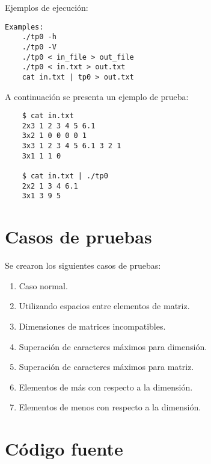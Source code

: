 \documentclass[a4paper,10pt]{article}
\begin{document}
Ejemplos de ejecuci\'on:
\begin{verbatim}
Examples:
	./tp0 -h
	./tp0 -V
	./tp0 < in_file > out_file
	./tp0 < in.txt > out.txt
	cat in.txt | tp0 > out.txt

\end{verbatim}

A continuaci\'on se presenta un ejemplo de prueba:
\begin{verbatim}
	$ cat in.txt
	2x3 1 2 3 4 5 6.1
	3x2 1 0 0 0 0 1
	3x3 1 2 3 4 5 6.1 3 2 1
	3x1 1 1 0

	$ cat in.txt | ./tp0
	2x2 1 3 4 6.1
	3x1 3 9 5
\end{verbatim}
\pagebreak


\section{Casos de pruebas}
Se crearon los siguientes casos de pruebas:
\begin{enumerate}
\item Caso normal.	
\item Utilizando espacios entre elementos de matriz.
\item Dimensiones de matrices incompatibles.
\item Superaci\'on de caracteres m\'aximos para dimensi\'on.
\item Superaci\'on de caracteres m\'aximos para matriz.
\item Elementos de m\'as con respecto a la dimensi\'on.
\item Elementos de menos con respecto a la dimensi\'on.
\end{enumerate}				
\pagebreak


\section{C\'odigo fuente}
\end{document}
